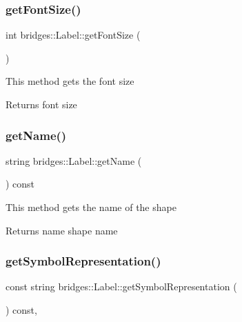 \subsubsection{\texorpdfstring{get\+Font\+Size()}{getFontSize()}}
{\footnotesize\ttfamily int bridges\+::\+Label\+::get\+Font\+Size (\begin{DoxyParamCaption}{ }\end{DoxyParamCaption})\hspace{0.3cm}{\ttfamily [inline]}}

This method gets the font size

\begin{DoxyReturn}{Returns}
font size 
\end{DoxyReturn}
\mbox{\label{classbridges_1_1_label_a3a55f3d7e0794401bfb1c43ea85e7c86}} 
\subsubsection{\texorpdfstring{get\+Name()}{getName()}}
{\footnotesize\ttfamily string bridges\+::\+Label\+::get\+Name (\begin{DoxyParamCaption}{ }\end{DoxyParamCaption}) const\hspace{0.3cm}{\ttfamily [inline]}}

This method gets the name of the shape

\begin{DoxyReturn}{Returns}
name shape name 
\end{DoxyReturn}
\mbox{\label{classbridges_1_1_label_af4bdf9e492cf2a2bf3a8be42bd282b44}} 
\subsubsection{\texorpdfstring{get\+Symbol\+Representation()}{getSymbolRepresentation()}}
{\footnotesize\ttfamily const string bridges\+::\+Label\+::get\+Symbol\+Representation (\begin{DoxyParamCaption}{ }\end{DoxyParamCaption}) const\hspace{0.3cm}{\ttfamily [inline]}, {\ttfamily [virtual]}}

